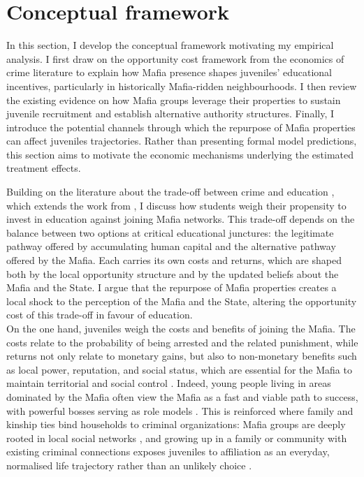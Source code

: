 \documentclass[12pt]{article}
\theoremstyle{plain}
\theoremstyle{plain}
\theoremstyle{plain}
\theoremstyle{definition}
\theoremstyle{plain}
\theoremstyle{definition}
\theoremstyle{plain}
\theoremstyle{remark}
\theoremstyle{definition}
\theoremstyle{definition}
\theoremstyle{plain}
\begin{document}
\section{Conceptual framework}
\label{sec:jmp_conc_framework}
In this section, I develop the conceptual framework motivating my empirical analysis. I first draw on the opportunity cost framework from the economics of crime literature to explain how Mafia presence shapes juveniles' educational incentives, particularly in historically Mafia-ridden neighbourhoods. I then review the existing evidence on how Mafia groups leverage their properties to sustain juvenile recruitment and establish alternative authority structures. Finally, I introduce the potential channels through which the repurpose of Mafia properties can affect juveniles trajectories. Rather than presenting formal model predictions, this section aims to motivate the economic mechanisms underlying the estimated treatment effects. \par
\medskip
Building on the literature  about the trade-off between crime and education \citep{lochner_education_2004, lochner_non-production_2011, lochner_effect_2004, machin_crime_2004}, which extends the work from \citet{becker_crime_1968}, I discuss how students weigh their propensity to invest in education against joining Mafia networks. This trade-off depends on the balance between two options at critical educational junctures: the legitimate pathway offered by accumulating human capital and the alternative pathway offered by the Mafia. Each carries its own costs and returns, which are shaped both by the local opportunity structure and by the updated beliefs about the Mafia and the State. I argue that the repurpose of Mafia properties creates a local shock to the perception of the Mafia and the State, altering the opportunity cost of this trade-off in favour of education. \\

On the one hand, juveniles weigh the costs and benefits of joining the Mafia. The costs relate to the probability of being arrested and the related punishment, while returns not only relate to monetary gains, but also to non-monetary benefits such as local power, reputation, and social status, which are essential for the Mafia to maintain territorial and social control \citep{gambetta_sicilian_1993, sciarrone_il_1998}. Indeed, young people living in areas dominated by the Mafia often view the Mafia as a fast and viable path to success, with powerful bosses serving as role models \citep{caglayan_organized_2017}. This is reinforced where family and kinship ties bind households to criminal organizations: Mafia groups are deeply rooted in local social networks \citep{sciarrone_il_1998}, and growing up in a family or community with existing criminal connections exposes juveniles to affiliation as an everyday, normalised life trajectory rather than an unlikely choice \citep{sviatschi_making_2022}.
\end{document}
